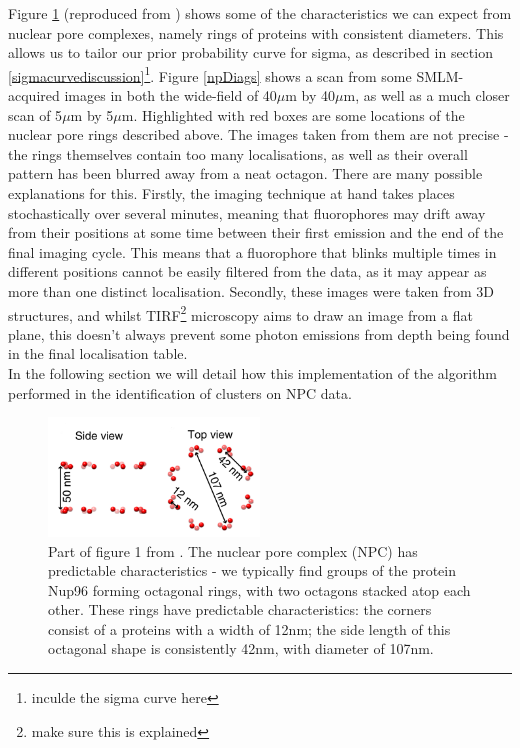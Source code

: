 \documentclass[11pt]{article}
\begin{document}
Figure \ref{npDiag} (reproduced from \cite{Thevathasan2019}) shows some of the characteristics we can expect from nuclear pore complexes, namely rings of proteins with consistent diameters. This allows us to tailor our prior probability curve for sigma, as described in section \ref{sigmacurvediscussion}\footnote{inculde the sigma curve here}. Figure \ref{npDiags} shows a scan from some SMLM-acquired images in both the wide-field of 40$\mu$m by 40$\mu$m, as well as a much closer scan of 5$\mu$m by 5$\mu$m. Highlighted with red boxes are some locations of the nuclear pore rings described above. The images taken from them are not precise - the rings themselves contain too many localisations, as well as their overall pattern has been blurred away from a neat octagon. There are many possible explanations for this. Firstly, the imaging technique at hand takes places stochastically over several minutes, meaning that fluorophores may drift away from their positions at some time between their first emission and the end of the final imaging cycle. This means that a fluorophore that blinks multiple times in different positions cannot be easily filtered from the data, as it may appear as more than one distinct localisation. Secondly, these images were taken from 3D structures, and whilst TIRF\footnote{make sure this is explained} microscopy aims to draw an image from a flat plane, this doesn't always prevent some photon emissions from depth being found in the final localisation table. \\

In the following section we will detail how this implementation of the algorithm performed in the identification of clusters on NPC data.


\begin{figure}
\centering
\includegraphics[width=0.5\textwidth]{figs/np.png}
\caption{Part of figure 1 from \cite{Thevathasan2019}. The nuclear pore complex (NPC) has predictable characteristics - we typically find groups of the protein Nup96 forming octagonal rings, with two octagons stacked atop each other. These rings have predictable characteristics: the corners consist of a proteins with a width of 12nm; the side length of this octagonal shape is consistently 42nm, with diameter of 107nm.}
\label{npDiag}
\end{figure}
\end{document}
